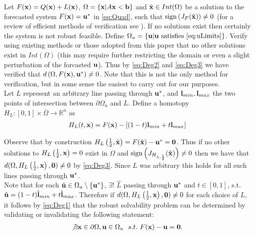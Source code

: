 Let $F(\bold x)=Q(\bold x)+L(\bold x)$, $\Omega=\{\bold x| A\bold x< \bold b\}$ and $\hat{\bold x}\in Int(\Omega)$ be a solution to the forecasted system $F(\bold x)=\bold u^*$ in \ref{eq:Quad}, such that $\operatorname{sign}\left(J_{F}(\hat{\bold x})\right)\neq 0$ (for a review of efficient methods of verification see \cite{GRIEWANK2014}). 
If no solutions exist then certainly the system is not robust feasible. Define $\Omega_u=\{\bold u| \bold u\text{ satisfies }\ref{eq:uLimits}\}$.
Verify using existing methods or those adopted from this paper that no other solutions exist in $Int(\Omega)$ (this may require further restricting the domain or even a slight perturbation of the forcasted $\bold u$). 
Thus by \ref{eq:Deg2} and \ref{eq:Deg3} we have verified that $d\left(\Omega, F(\bold x), \bold u^*\right)\neq 0$. 
Note that this is not the only method for verification, but in some sense the easiest to carry out for our purposes. \\

Let $L$ represent an arbitrary line passing through $\bold u^*$, and $\bold l_{min},\bold l_{max}$ the two points of intersection between $\partial\Omega_u$ and $L$. 
Define a homotopy $H_L : [0,1]\times\bar{\Omega}\rightarrow\mathbb{R}^n$ as 
\begin{align}
H_L(t,\bold x) = F(\bold x)-\left[(1-t)\bold l_{min}+t\bold l_{max}\right] \label{eq:Homo}
\end{align}

Observe that by construction $H_L\left(\frac{1}{2},\hat{\bold x}\right)=F(\hat{\bold x})-\bold u^*=\textbf{0}$. 
Thus if no other solutions to $H_L\left(\frac{1}{2},\bold x\right)=0$ exist in $\Omega$ and $\operatorname{sign}\left(J_{H_{L,\frac{1}{2}}}(\hat{\bold x})\right)\neq 0$ then we have that $d(\Omega,H_L\left(\frac{1}{2},\bold x\right),\textbf{0})\neq 0$ by \ref{eq:Deg3}. 
Since $L$ was arbitrary this holds for all such lines passing through $\bold u^*$.\\
Note that for each $\hat{\bold u}\in\Omega_u\setminus\{\bold u^*\}$, $\exists !$ $\hat{L}$ passing through $\bold u^*$ and $t\in[0,1]$,  s.t. $\hat{\bold u}=(1-t)\hat{\bold l}_{min}+t\hat{\bold l}_{max}$. 
Therefore if $d(\Omega,H_L\left(\frac{1}{2},\bold x\right),\bold 0)\neq 0$ for each choice of $L$, it follows by \ref{eq:Deg1} that the robust solvability problem can be determined by validating or invalidating the following statement:
\begin{align}
\not\exists \bold x\in\partial\Omega, \bold u\in\Omega_u \ \ s.t. \ F(\bold x)-\bold u=\bold 0. \label{eq:RSForm}
\end{align}

